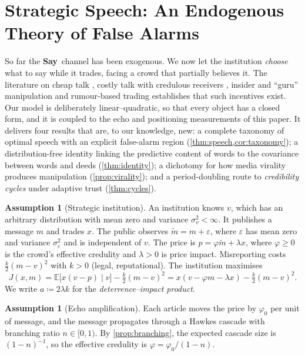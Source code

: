 \documentclass[11pt,a4paper]{article}
\theoremstyle{plain}
\theoremstyle{definition}
\newtheorem{assumption}[theorem]{Assumption}
\theoremstyle{remark}
\newcommand{\E}{\mathbb{E}}
\newcommand{\SAY}{\textcolor{say}{\textbf{Say}}}
\begin{document}
\section{Strategic Speech: An Endogenous Theory of False Alarms}\label{sec:strategic}

So far the \SAY\ channel has been exogenous. We now let the institution \emph{choose} what to say while it trades, facing a crowd that partially believes it. The literature on cheap talk \citep{crawford1982}, costly talk with credulous receivers \citep{kartik2007}, insider and ``guru'' manipulation \citep{benabou1992} and rumour-based trading \citep{vanbommel2003} establishes that such incentives exist. Our model is deliberately linear--quadratic, so that every object has a closed form, and it is coupled to the echo and positioning measurements of this paper. It delivers four results that are, to our knowledge, new: a complete taxonomy of optimal speech with an explicit false-alarm region (\cref{thm:speech,cor:taxonomy}); a distribution-free identity linking the predictive content of words to the covariance between words and deeds (\cref{thm:identity}); a dichotomy for how media virality produces manipulation (\cref{prop:virality}); and a period-doubling route to \emph{credibility cycles} under adaptive trust (\cref{thm:cycles}).

\begin{assumption}[Strategic institution]\label{ass:strategic}
An institution knows $v$, which has an arbitrary distribution with mean zero and variance $\sigma_v^2<\infty$. It publishes a message $m$ and trades $x$. The public observes $\tilde m=m+\varepsilon$, where $\varepsilon$ has mean zero and variance $\sigma_\varepsilon^2$ and is independent of $v$. The price is $p=\varphi\tilde m+\lambda x$, where $\varphi\ge0$ is the crowd's effective credulity and $\lambda>0$ is price impact. Misreporting costs $\tfrac k2(m-v)^2$ with $k>0$ (legal, reputational). The institution maximises
\[
  J(x,m)=\E\big[x(v-p)\mid v\big]-\tfrac k2(m-v)^2=x(v-\varphi m-\lambda x)-\tfrac k2(m-v)^2 .
\]
We write $a\coloneqq2\lambda k$ for the \emph{deterrence--impact product}.
\end{assumption}

\begin{assumption}[Echo amplification]\label{ass:amplify}
Each article moves the price by $\varphi_0$ per unit of message, and the message propagates through a Hawkes cascade with branching ratio $n\in[0,1)$. By \cref{prop:branching}, the expected cascade size is $(1-n)^{-1}$, so the effective credulity is $\varphi=\varphi_0/(1-n)$.
\end{assumption}
\end{document}
